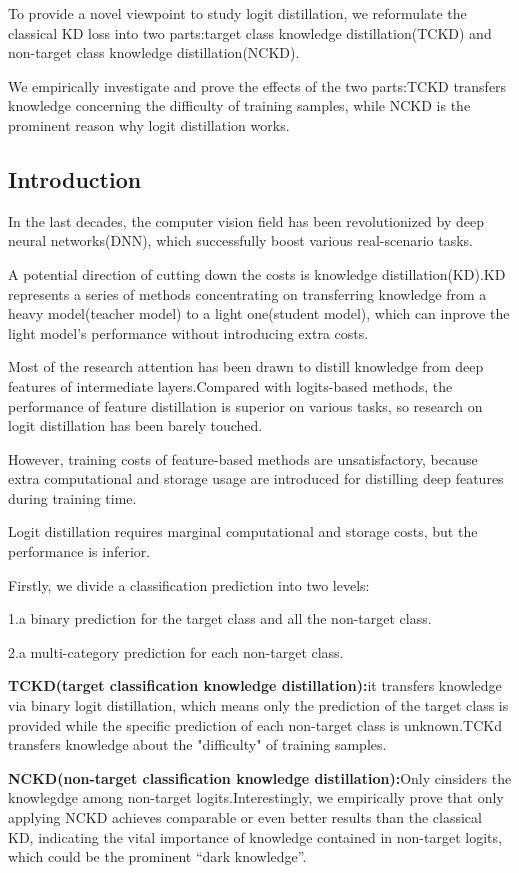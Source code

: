 \documentclass[11pt]{article}
\begin{document}
To provide a novel viewpoint to study logit distillation, we reformulate the classical KD loss into two parts:target class knowledge distillation(TCKD) and non-target class knowledge distillation(NCKD).

We empirically investigate and prove the effects of the two parts:TCKD transfers knowledge concerning the difficulty of training samples, while NCKD is the prominent reason why logit distillation works.

\subsection{Introduction}
In the last decades, the computer vision field has been revolutionized by deep neural networks(DNN), which successfully boost various real-scenario tasks.

A potential direction of cutting down the costs is knowledge distillation(KD).KD represents a series of methods concentrating on transferring knowledge from a heavy model(teacher model) to a light one(student model), which can inprove the light model's performance without introducing extra costs.

Most of the research attention has been drawn to distill knowledge from deep features of intermediate layers.Compared with logits-based methods, the performance of feature distillation is superior on various tasks, so research on logit distillation has been barely touched.

However, training costs of feature-based methods are unsatisfactory, because extra computational and storage usage are introduced for distilling deep features during training time.

Logit distillation requires marginal computational and storage costs, but the performance is inferior.

Firstly, we divide a classification prediction into two levels:

\noindent1.a binary prediction for the target class and all the non-target class.

\noindent2.a multi-category prediction for each non-target class.


\textbf{TCKD(target classification knowledge distillation):}it transfers knowledge via binary logit distillation, which means only the prediction of the target class is provided while the specific prediction of each non-target class is unknown.TCKd transfers knowledge about the "difficulty" of training samples.

\textbf{NCKD(non-target classification knowledge distillation):}Only cinsiders the knowlegdge among non-target logits.Interestingly, we empirically prove that only applying NCKD achieves comparable or even better results than the classical KD, indicating the vital importance of knowledge contained in non-target logits, which could be the prominent “dark knowledge”.
\end{document}

